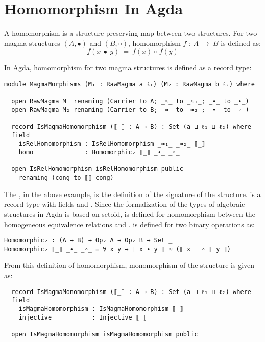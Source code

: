 \section{Homomorphism In Agda}
\label{morphism}
A homomorphism is a structure-preserving map between two structures.  For two
magma structures $(A,∙)$ and $(B,◦)$, homomorphism  \(f\) : \(A \ \rightarrow
\ B\) is defined as:
\[f(x\  ∙ \  y) \ = \ f(x) \ ◦ \  f(y)\] 

In Agda, homomorphism for two magma structures is defined as a record type:

\begin{verbatim}
module MagmaMorphisms (M₁ : RawMagma a ℓ₁) (M₂ : RawMagma b ℓ₂) where

  open RawMagma M₁ renaming (Carrier to A; _≈_ to _≈₁_; _∙_ to _∙_)
  open RawMagma M₂ renaming (Carrier to B; _≈_ to _≈₂_; _∙_ to _◦_)

  record IsMagmaHomomorphism (⟦_⟧ : A → B) : Set (a ⊔ ℓ₁ ⊔ ℓ₂) where
  field
    isRelHomomorphism : IsRelHomomorphism _≈₁_ _≈₂_ ⟦_⟧
    homo              : Homomorphic₂ ⟦_⟧ _∙_ _◦_

  open IsRelHomomorphism isRelHomomorphism public
    renaming (cong to ⟦⟧-cong)
\end{verbatim}

The , in the above example,  is the
definition of the signature of the structure.  is a
record type with fields  and . Since the
formalization of the types of algebraic structures in Agda is based on setoid,
 is defined for homomorphism between the homogeneous
equivalence relations  and .  is
defined for two binary operations as:

\begin{verbatim}
Homomorphic₂ : (A → B) → Op₂ A → Op₂ B → Set _
Homomorphic₂ ⟦_⟧ _∙_ _∘_ = ∀ x y → ⟦ x ∙ y ⟧ ≈ (⟦ x ⟧ ∘ ⟦ y ⟧)
\end{verbatim}

From this definition of homomorphism, monomorphism of the structure is given as:

\begin{verbatim}
  record IsMagmaMonomorphism (⟦_⟧ : A → B) : Set (a ⊔ ℓ₁ ⊔ ℓ₂) where
  field
    isMagmaHomomorphism : IsMagmaHomomorphism ⟦_⟧
    injective           : Injective ⟦_⟧

  open IsMagmaHomomorphism isMagmaHomomorphism public
\end{verbatim}

